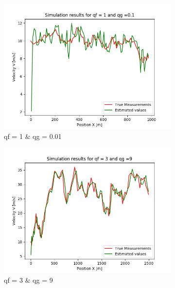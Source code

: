 \documentclass{article}
\begin{document}
        \begin{figure}[H]
            \begin{subfigure} {.3\textwidth}  
                \centering 
                \includegraphics[width=0.9\linewidth]{./img/qf1_qf01.png}
                \caption{qf = 1 \& qg = 0.01 }
            \end{subfigure}
            \begin{subfigure}{.3\textwidth}            
                \centering
                \includegraphics[width=0.9\linewidth]{./img/qf3_qg6.png}
                \caption{qf = 3 \& qg = 9}
            \end{subfigure}    
            \begin{subfigure} {.3\textwidth}         
                \centering

\end{subfigure}
\end{figure}
\end{document}
